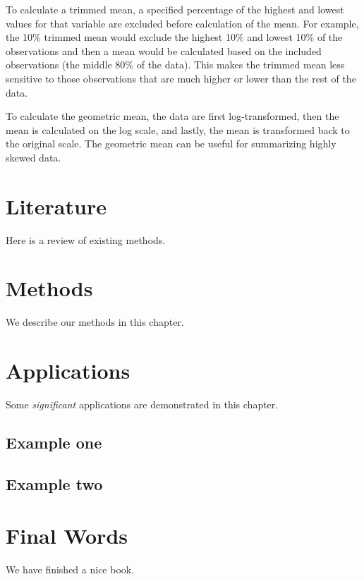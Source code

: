 \documentclass[
]{book}
\begin{document}
To calculate a trimmed mean, a specified percentage of the highest and lowest values for that variable are excluded before calculation of the mean. For example, the 10\% trimmed mean would exclude the highest 10\% and lowest 10\% of the observations and then a mean would be calculated based on the included observations (the middle 80\% of the data). This makes the trimmed mean less sensitive to those observations that are much higher or lower than the rest of the data.

To calculate the geometric mean, the data are first log-transformed, then the mean is calculated on the log scale, and lastly, the mean is transformed back to the original scale. The geometric mean can be useful for summarizing highly skewed data.

\hypertarget{literature}{%
\chapter{Literature}\label{literature}}

Here is a review of existing methods.

\hypertarget{methods}{%
\chapter{Methods}\label{methods}}

We describe our methods in this chapter.

\hypertarget{applications}{%
\chapter{Applications}\label{applications}}

Some \emph{significant} applications are demonstrated in this chapter.

\hypertarget{example-one}{%
\section{Example one}\label{example-one}}

\hypertarget{example-two}{%
\section{Example two}\label{example-two}}

\hypertarget{final-words}{%
\chapter{Final Words}\label{final-words}}

We have finished a nice book.

  
\end{document}
